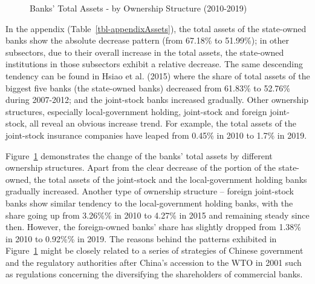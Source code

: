 \documentclass[
  12pt,
  a4paper,
  DIV=11,
  numbers=noendperiod]{scrreprt}
\begin{document}
\begin{figure}


\caption{\label{fig-AssetsOwnership}Banks' Total Assets - by Ownership
Structure (2010-2019)}

\end{figure}%

In the appendix (Table~\ref{tbl-appendixAssets}), the total assets of
the state-owned banks show the absolute decrease pattern (from 67.18\%
to 51.99\%); in other subsectors, due to their overall increase in the
total assets, the state-owned institutions in those subsectors exhibit a
relative decrease. The same descending tendency can be found in Hsiao et
al. (2015) where the share of total assets of the biggest five banks
(the state-owned banks) decreased from 61.83\% to 52.76\% during
2007-2012; and the joint-stock banks increased gradually. Other
ownership structures, especially local-government holding, joint-stock
and foreign joint-stock, all reveal an obvious increase trend. For
example, the total assets of the joint-stock insurance companies have
leaped from 0.45\% in 2010 to 1.7\% in 2019.

Figure~\ref{fig-AssetsOwnership} demonstrates the change of the banks'
total assets by different ownership structures. Apart from the clear
decrease of the portion of the state-owned, the total assets of the
joint-stock and the local-government holding banks gradually increased.
Another type of ownership structure -- foreign joint-stock banks show
similar tendency to the local-government holding banks, with the share
going up from 3.26\%\% in 2010 to 4.27\% in 2015 and remaining steady
since then. However, the foreign-owned banks' share has slightly dropped
from 1.38\% in 2010 to 0.92\%\% in 2019. The reasons behind the patterns
exhibited in Figure~\ref{fig-AssetsOwnership} might be closely related
to a series of strategies of Chinese government and the regulatory
authorities after China's accession to the WTO in 2001 such as
regulations concerning the diversifying the shareholders of commercial
banks.
\end{document}
